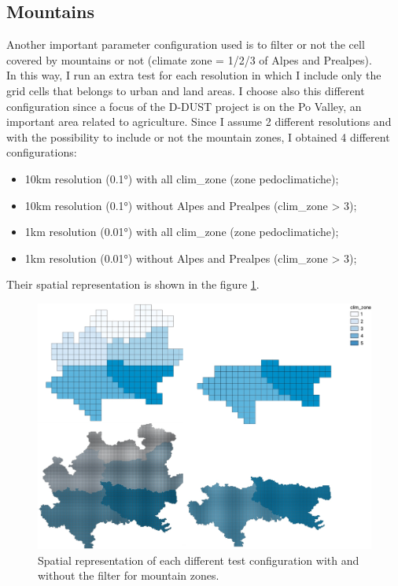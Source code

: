 \subsection{Mountains}
\label{sub:mountains}
Another important parameter configuration used is to filter or not the cell covered by mountains or not (climate zone = 1/2/3 of Alpes and Prealpes). \\ 
In this way, I run an extra test for each resolution in which I include only the grid cells that belongs to urban and land areas.
I choose also this different configuration since a focus of the D-DUST project is on the Po Valley, an important area related to agriculture.
Since I assume 2 different resolutions and with the possibility to include or not the mountain zones, I obtained 4 different configurations: 
\par
\begin{itemize}
    \item 10km resolution (0.1°) with all clim\_zone (zone pedoclimatiche);
    \item 10km resolution (0.1°) without Alpes and Prealpes (clim\_zone > 3);
    \item 1km resolution (0.01°) with all clim\_zone (zone pedoclimatiche);
    \item 1km resolution (0.01°) without Alpes and Prealpes (clim\_zone > 3);
\end{itemize}
Their spatial representation is shown in the figure \ref{fig:configuration}.
\begin{figure}[H] 
\centering
\includegraphics[scale=0.3]{images/configurations.png}
  \caption{Spatial representation of each different test configuration with and without the filter for mountain zones.}
 \label{fig:configuration}
\end{figure}
